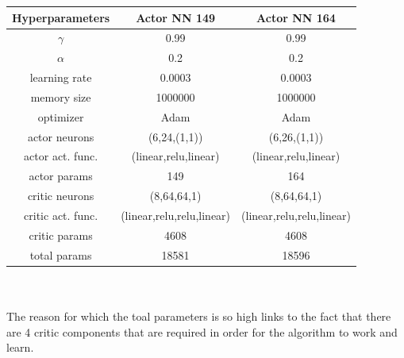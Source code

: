 \newline
\vspace{0.5 cm}
\newline
\begin{tabular}{|c|c|c|}
\hline
Hyperparameters & Actor NN 149 & Actor NN 164 \\
\hline
$\gamma$  & 0.99 & 0.99 \\
\hline
$\alpha$ & 0.2 & 0.2 \\
\hline
learning rate  & 0.0003 & 0.0003 \\
\hline
memory size  & 1000000 & 1000000 \\
\hline
optimizer  & Adam & Adam \\
\hline
actor neurons & (6,24,(1,1)) & (6,26,(1,1)) \\
\hline
actor act. func. & (linear,relu,linear) & (linear,relu,linear) \\
\hline
actor params & 149 & 164 \\
\hline
critic neurons & (8,64,64,1) & (8,64,64,1) \\
\hline
critic act. func. & (linear,relu,relu,linear) & (linear,relu,relu,linear) \\
\hline
critic params & 4608 & 4608 \\
\hline
total params  & 18581 & 18596 \\
\hline
\end{tabular}\\
\\
The reason for which the toal parameters is so high links to the fact that there are 4 critic components that are required in order for the algorithm to work and learn.
